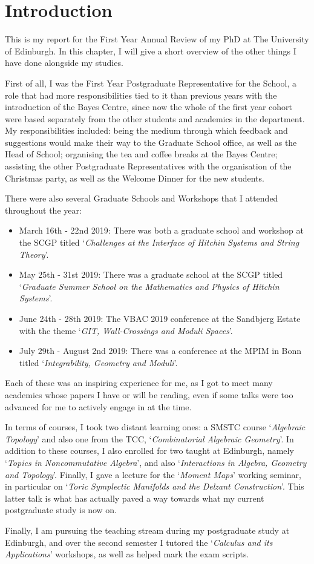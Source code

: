 \chapter{Introduction}

This is my report for the First Year Annual Review of my PhD at The University of Edinburgh. In this chapter, I will give a short overview of the other things I have done alongside my studies.

First of all, I was the First Year Postgraduate Representative for the School, a role that had more responsibilities tied to it than previous years with the introduction of the Bayes Centre, since now the whole of the first year cohort were based separately from the other students and academics in the department. My responsibilities included: being the medium through which feedback and suggestions would make their way to the Graduate School office, as well as the Head of School; organising the tea and coffee breaks at the Bayes Centre; assisting the other Postgraduate Representatives with the organisation of the Christmas party, as well as the Welcome Dinner for the new students.

There were also several Graduate Schools and Workshops that I attended throughout the year:
\begin{itemize}
	\item March 16th - 22nd 2019: There was both a graduate school and workshop at the SCGP titled `\emph{Challenges at the Interface of Hitchin Systems and String Theory}'.
	\item May 25th - 31st 2019: There was a graduate school at the SCGP titled `\emph{Graduate Summer School on the Mathematics and Physics of Hitchin Systems}'.
	\item June 24th - 28th 2019: The VBAC 2019 conference at the Sandbjerg Estate with the theme `\emph{GIT, Wall-Crossings and Moduli Spaces}'.
	\item July 29th - August 2nd 2019: There was a conference at the MPIM in Bonn titled `\emph{Integrability, Geometry and Moduli}'.
\end{itemize}
Each of these was an inspiring experience for me, as I got to meet many academics whose papers I have or will be reading, even if some talks were too advanced for me to actively engage in at the time.

In terms of courses, I took two distant learning ones: a SMSTC course `\emph{Algebraic Topology}' and also one from the TCC, `\emph{Combinatorial Algebraic Geometry}'. In addition to these courses, I also enrolled for two taught at Edinburgh, namely `\emph{Topics in Noncommutative Algebra}', and also `\emph{Interactions in Algebra, Geometry and Topology}'. Finally, I gave a lecture for the `\emph{Moment Maps}' working seminar, in particular on `\emph{Toric Symplectic Manifolds and the Delzant Construction}'. This latter talk is what has actually paved a way towards what my current postgraduate study is now on.

Finally, I am pursuing the teaching stream during my postgraduate study at Edinburgh, and over the second semester I tutored the `\emph{Calculus and its Applications}' workshops, as well as helped mark the exam scripts.